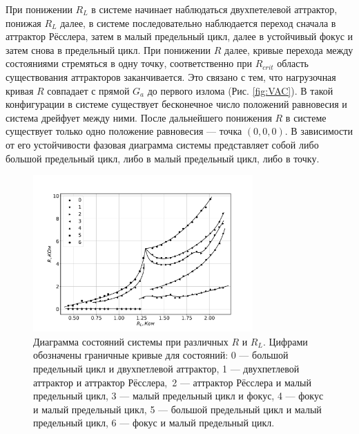 \documentclass[12pt]{article}
\begin{document}
При понижении $R_L$ в системе начинает наблюдаться двухпетелевой аттрактор, понижая $R_L$ далее, в системе последовательно 
наблюдается переход сначала в аттрактор Рёсслера, затем в малый предельный цикл, далее в устойчивый фокус и затем снова в предельный цикл. 
При понижении $R$ далее, кривые перехода между состояниями стремяться в одну точку, соответственно при $R_{crit}$ область существования аттракторов 
заканчивается. Это связано с тем, что нагрузочная кривая $R$ совпадает с прямой $G_a$ до первого излома (Рис. \ref{fig:VAC}). 
В такой конфигурации в системе существует бесконечное число положений равновесия и система дрейфует между ними. 
После дальнейшего понижения $R$ в системе существует только одно положение равновесия --- точка $(0, 0, 0)$. В зависимости от его 
устойчивости фазовая диаграмма системы представляет собой либо большой предельный цикл, либо в малый предельный цикл, либо в точку.    


\begin{figure}[H]
	\centering
	\includegraphics[width=0.75\textwidth]{bif_diag_teor.pdf}
	\caption{Диаграмма состояний системы при различных $R$ и $R_L$. 
	Цифрами обозначены граничные кривые для состояний: 
	0 --- большой предельный цикл и двухпетлевой аттрактор,
	1 --- двухпетлевой аттрактор и аттрактор Рёсслера,\
	2 --- аттрактор Рёсслера и малый предельный цикл,
	3 --- малый предельный цикл и фокус, 
	4 --- фокус и малый предельный цикл, 
	5 --- большой предельный цикл и малый предельный цикл,
	6 --- фокус и малый предельный цикл.}
	\label{fig:phase_diag_teor}
\end{figure}
\end{document}
